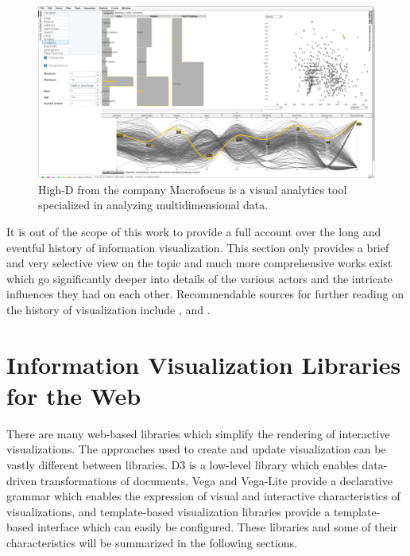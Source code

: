 \begin{figure}[tp]
\centering
\includegraphics[keepaspectratio,width=\linewidth,height=\fullh / 3]{images/high-d.png}
\caption[Screenshot of High-D]{
  High-D from the company Macrofocus is a visual analytics tool specialized in analyzing multidimensional data.
   
}
\label{fig:HighD}
\end{figure}

It is out of the scope of this work to provide a full account over the long and eventful history of information visualization.
This section only provides a brief and very selective view on the topic and much more comprehensive works exist which go significantly deeper into details of the various actors and the intricate influences they had on each other.
Recommendable sources for further reading on the history of visualization include \textcite{BriefHistoryOfDataVis}, \textcite{HistoryOfDataVisAndGraphicCommunication} and \textcite{HistoryOfInformationGraphics}.

\section{Information Visualization Libraries for the Web}

There are many web-based libraries which simplify the rendering of interactive visualizations.
The approaches used to create and update visualization can be vastly different between libraries.
D3 is a low-level library which enables data-driven transformations of documents, Vega and Vega-Lite provide a declarative grammar which enables the expression of visual and interactive characteristics of visualizations, and template-based visualization libraries provide a template-based interface which can easily be configured.
These libraries and some of their characteristics will be summarized in the following sections.

